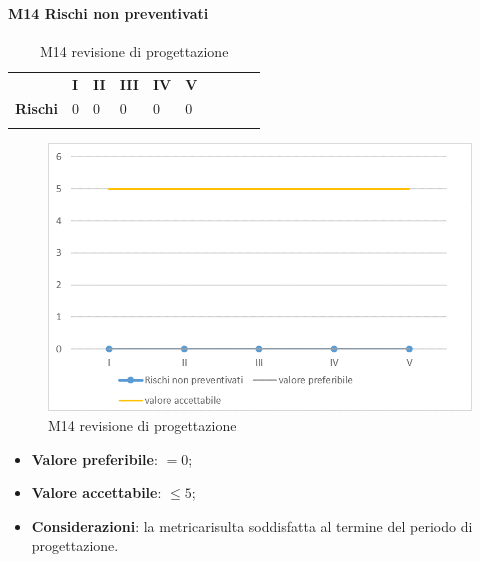 \paragraph{M14 Rischi non preventivati} \mbox{}
\begin{longtable}[H!] {						
		>{}p{50mm}  		
		>{}p{8mm}
		>{}p{8mm}		
		>{}p{8mm}		
		>{}p{8mm}		
		>{}p{8mm}		
		>{}p{8mm}
		>{}p{8mm}
		>{}p{8mm}
		>{}p{8mm}
	}
	\rowcolor{gray!50}
	\textbf{} & \textbf{I} & \textbf{II} & \textbf{III} & \textbf{IV} & \textbf{V} \TBstrut \\ [2mm]
	\textbf{Rischi} & 0 & 0 & 0 & 0 & 0 \TBstrut \\ [2mm]
	\rowcolor{white}
	\caption{M14 revisione di progettazione\glo}
\end{longtable}
\begin{figure}[H] 	
\includegraphics[width=\linewidth]{./img/grafici/RP11.png}	
\caption{M14 revisione di progettazione\glo}	
\end{figure}
\begin{itemize}
	\item \textbf{Valore preferibile}: $=0$;
	\item \textbf{Valore accettabile}: $\le 5$;
	\item \textbf{Considerazioni}: la metrica\glosp risulta soddisfatta al termine del periodo di progettazione\glo.
\end{itemize}
